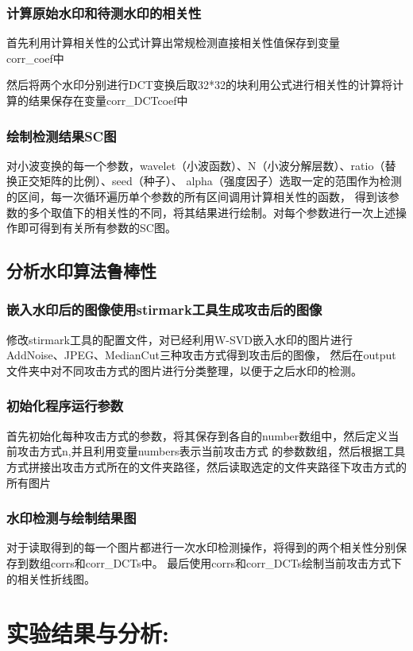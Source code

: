 \documentclass[a4paper,11pt,UTF8]{ctexart}
\begin{document}
    \subsubsection{计算原始水印和待测水印的相关性}
      首先利用计算相关性的公式计算出常规检测直接相关性值保存到变量\\corr\_coef中\par
      然后将两个水印分别进行DCT变换后取32*32的块利用公式进行相关性的计算将计算的结果保存在变量corr\_DCTcoef中
    \subsubsection{绘制检测结果SC图}
      对小波变换的每一个参数，wavelet（小波函数）、N（小波分解层数）、ratio（替换正交矩阵的比例）、seed（种子）、
      alpha（强度因子）选取一定的范围作为检测的区间，每一次循环遍历单个参数的所有区间调用计算相关性的函数，
      得到该参数的多个取值下的相关性的不同，将其结果进行绘制。对每个参数进行一次上述操作即可得到有关所有参数的SC图。
  \subsection{分析水印算法鲁棒性}
    \subsubsection{嵌入水印后的图像使用stirmark工具生成攻击后的图像}
      修改stirmark工具的配置文件，对已经利用W-SVD嵌入水印的图片进行 \\
      AddNoise、JPEG、MedianCut三种攻击方式得到攻击后的图像，
      然后在output文件夹中对不同攻击方式的图片进行分类整理，以便于之后水印的检测。
    \subsubsection{初始化程序运行参数}
      首先初始化每种攻击方式的参数，将其保存到各自的number数组中，然后定义当前攻击方式n,并且利用变量numbers表示当前攻击方式
      的参数数组，然后根据工具方式拼接出攻击方式所在的文件夹路径，然后读取选定的文件夹路径下攻击方式的所有图片
    \subsubsection{水印检测与绘制结果图}
      对于读取得到的每一个图片都进行一次水印检测操作，将得到的两个相关性分别保存到数组corrs和corr\_DCTs中。
      最后使用corrs和corr\_DCTs绘制当前攻击方式下的相关性折线图。

\section{实验结果与分析:}
\end{document}
